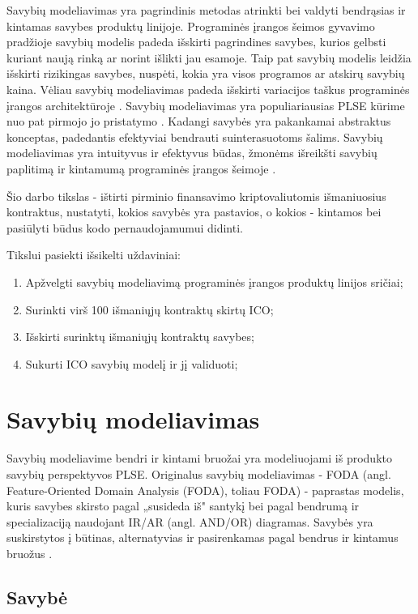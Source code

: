 \documentclass{VUMIFPSkursinis}
\begin{document}
Savybių modeliavimas yra pagrindinis metodas atrinkti bei valdyti bendrąsias ir kintamas savybes produktų linijoje. Programinės įrangos šeimos gyvavimo pradžioje savybių modelis padeda išskirti pagrindines savybes, kurios gelbsti kuriant naują rinką ar  norint išlikti jau esamoje. Taip pat savybių modelis leidžia išskirti rizikingas savybes, nuspėti, kokia yra visos programos ar atskirų savybių kaina. Vėliau savybių modeliavimas padeda išskirti variacijos taškus programinės įrangos architektūroje \cite{Czarnecki2004}. Savybių modeliavimas yra populiariausias PLSE kūrime nuo pat pirmojo jo pristatymo \cite{Kang1990}. Kadangi savybės yra pakankamai abstraktus konceptas, padedantis efektyviai bendrauti suinterasuotoms šalims. Savybių modeliavimas yra intuityvus ir efektyvus būdas, žmonėms išreikšti savybių paplitimą ir kintamumą programinės įrangos šeimoje \cite{Kang2013}. 

Šio darbo tikslas - ištirti pirminio finansavimo kriptovaliutomis išmaniuosius kontraktus, nustatyti, kokios savybės yra pastavios, o kokios - kintamos bei pasiūlyti būdus kodo pernaudojamumui didinti. 

Tikslui pasiekti išsikelti uždaviniai:
\begin{enumerate}
\item Apžvelgti savybių modeliavimą programinės įrangos produktų linijos sričiai;
\item Surinkti virš 100 išmaniųjų kontraktų skirtų ICO;
\item Išskirti surinktų išmaniųjų kontraktų savybes;
\item Sukurti ICO savybių modelį ir jį validuoti;
\end{enumerate}

\section{Savybių modeliavimas}

Savybių modeliavime bendri ir kintami bruožai yra modeliuojami iš produkto savybių perspektyvos PLSE. Originalus savybių modeliavimas - FODA (angl. Feature-Oriented Domain Analysis (FODA), toliau FODA) \cite{Kang1990} - paprastas modelis, kuris savybes skirsto pagal „susideda iš" santykį bei pagal bendrumą ir specializaciją naudojant IR/AR (angl. AND/OR)  diagramas. Savybės yra suskirstytos į būtinas, alternatyvias ir pasirenkamas pagal bendrus ir kintamus bruožus \cite{Kang2013}.

\subsection{Savybė} \label{savybe}
\end{document}
